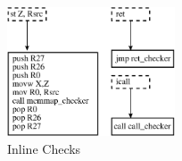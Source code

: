 \begin{figure}[htbp]
   \centering
   \includegraphics[height=1.5in, keepaspectratio=true]{figures/rewriter.eps} 
   \caption{Inline Checks}
   \label{fig:inlinechecks}
\end{figure}
%

%

%
%
